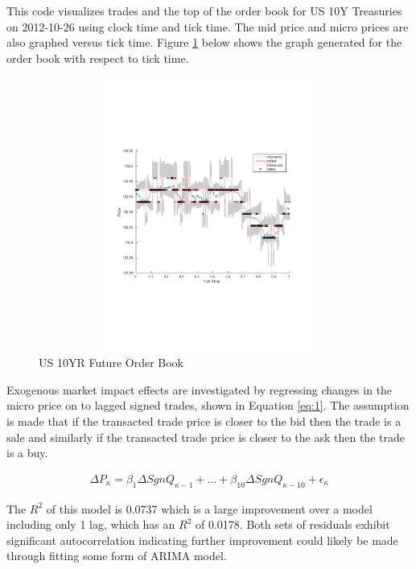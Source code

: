 \documentclass[paper=a4, fontsize=11pt]{scrartcl}\usepackage[]{graphicx}\usepackage[]{color}
\begin{document}
This code visualizes trades and the top of the order book for US 10Y Treasuries on 2012-10-26 using
clock time and tick time. The mid price and micro prices are also graphed versus tick time.
Figure \ref{fig:ticktime} below shows the graph generated for the order book with respect to tick
time.

\begin{figure}[H]
\begin{center}
\includegraphics[height=9cm, width=12cm, trim=4cm 7cm 4cm 7cm]{ticktime.pdf}
\caption{US 10YR Future Order Book}
\label{fig:ticktime}
\end{center}
\end{figure}

Exogenous market impact effects are investigated by regressing changes in the micro price on to
lagged signed trades, shown in Equation \ref{eq:1}. The assumption is made that if the transacted trade price is closer to the bid then the trade is a sale and similarly if the transacted trade price is closer to the ask then the trade is a buy.

\begin{align} \label{eq:1}
\Delta P_{\kappa} = \beta_{1}\Delta Sgn Q_{\kappa - 1} + ... + \beta_{10}\Delta Sgn Q_{\kappa - 10} + \epsilon_{\kappa}
\end{align}

The $R^2$ of this model is 0.0737 which is a large improvement over a model including only 1 lag, which has an $R^2$ of 0.0178. Both sets of residuals exhibit significant autocorrelation indicating further improvement could likely be made through fitting some form of ARIMA model.
\end{document}
